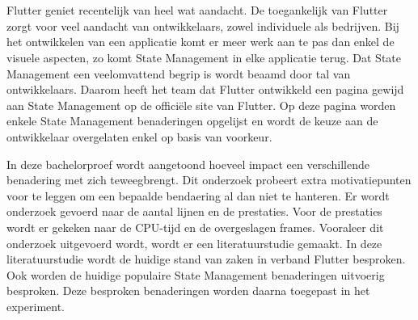 
%
%



\chapter*{}
Flutter geniet recentelijk van heel wat aandacht. De toegankelijk van Flutter zorgt voor veel aandacht van ontwikkelaars, zowel individuele als bedrijven. Bij het ontwikkelen van een applicatie komt er meer werk aan te pas dan enkel de visuele aspecten, zo komt State Management in elke applicatie terug. Dat State Management een veelomvattend begrip is wordt beaamd door tal van ontwikkelaars. Daarom heeft het team dat Flutter ontwikkeld een pagina gewijd aan State Management op de officiële site van Flutter. Op deze pagina worden enkele State Management benaderingen opgelijst en wordt de keuze aan de ontwikkelaar overgelaten enkel op basis van voorkeur.\newline 

In deze bachelorproef wordt aangetoond hoeveel impact een verschillende benadering met zich teweegbrengt. Dit onderzoek probeert extra motivatiepunten voor te leggen om een bepaalde bendaering al dan niet te hanteren. Er wordt onderzoek gevoerd naar de aantal lijnen en de prestaties. Voor de prestaties wordt er gekeken naar de CPU-tijd en de overgeslagen frames.
\newline
Vooraleer dit onderzoek uitgevoerd wordt, wordt er een literatuurstudie gemaakt. In deze literatuurstudie wordt de huidige stand van zaken in verband Flutter besproken. Ook worden de huidige populaire State Management benaderingen uitvoerig besproken. Deze besproken benaderingen worden daarna toegepast in het experiment. \newline 

